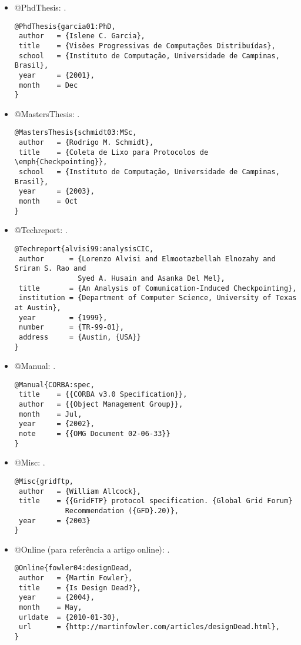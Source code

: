 \begin{itemize}
\item @PhdThesis: \cite{garcia01:PhD}.
{\scriptsize\begin{verbatim}
@PhdThesis{garcia01:PhD,
 author   = {Islene C. Garcia},
 title    = {Visões Progressivas de Computações Distribuídas},
 school   = {Instituto de Computação, Universidade de Campinas, Brasil},
 year     = {2001},
 month    = Dec
}
\end{verbatim}
}

\item @MastersThesis: \cite{schmidt03:MSc}.
{\scriptsize\begin{verbatim}
@MastersThesis{schmidt03:MSc,
 author   = {Rodrigo M. Schmidt},
 title    = {Coleta de Lixo para Protocolos de \emph{Checkpointing}},
 school   = {Instituto de Computação, Universidade de Campinas, Brasil},
 year     = {2003},
 month    = Oct
}
\end{verbatim}
}

\item @Techreport: \cite{alvisi99:analysisCIC}.
{\scriptsize\begin{verbatim}
@Techreport{alvisi99:analysisCIC,
 author      = {Lorenzo Alvisi and Elmootazbellah Elnozahy and Sriram S. Rao and
               Syed A. Husain and Asanka Del Mel},
 title       = {An Analysis of Comunication-Induced Checkpointing},
 institution = {Department of Computer Science, University of Texas at Austin},
 year        = {1999},
 number      = {TR-99-01},
 address     = {Austin, {USA}}
}
\end{verbatim}
}

\item @Manual: \cite{CORBA:spec}.
{\scriptsize\begin{verbatim}
@Manual{CORBA:spec,
 title    = {{CORBA v3.0 Specification}},
 author   = {{Object Management Group}},
 month    = Jul,
 year     = {2002},
 note     = {{OMG Document 02-06-33}}
}
\end{verbatim}
}

\item @Misc: \cite{gridftp}.
{\scriptsize\begin{verbatim}
@Misc{gridftp,
 author   = {William Allcock},
 title    = {{GridFTP} protocol specification. {Global Grid Forum}
            Recommendation ({GFD}.20)},
 year     = {2003}
}
\end{verbatim}
}

\item @Online (para referência a artigo online): \cite{fowler04:designDead}.
{\scriptsize\begin{verbatim}
@Online{fowler04:designDead,
 author   = {Martin Fowler},
 title    = {Is Design Dead?},
 year     = {2004},
 month    = May,
 urldate  = {2010-01-30},
 url      = {http://martinfowler.com/articles/designDead.html},
}
\end{verbatim}
}


\end{itemize}
